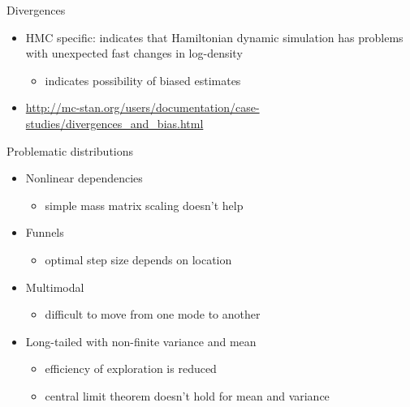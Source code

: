 \documentclass[finnish,english,t]{beamer}
\begin{document}
\begin{frame}{Divergences}

  \begin{itemize}
  \item HMC specific: indicates that Hamiltonian dynamic simulation
    has problems with unexpected fast changes in log-density
    \begin{itemize}
    \item indicates possibility of biased estimates
    \end{itemize}
  \item {\small \url{http://mc-stan.org/users/documentation/case-studies/divergences_and_bias.html}}
  \end{itemize}
\end{frame}


\begin{frame}{Problematic distributions}

  \begin{itemize}
  \item<1-> Nonlinear dependencies
    \begin{itemize}
    \item simple mass matrix scaling doesn't help
    \end{itemize}
  \item<2-> Funnels
    \begin{itemize}
    \item optimal step size depends on location
    \end{itemize}
  \item<3-> Multimodal
    \begin{itemize}
    \item difficult to move from one mode to another
    \end{itemize}
  \item<4-> Long-tailed with non-finite variance and mean
    \begin{itemize}
    \item efficiency of exploration is reduced
    \item central limit theorem doesn't hold for mean and variance
    \end{itemize}
  \end{itemize}

\end{frame}
\end{document}
